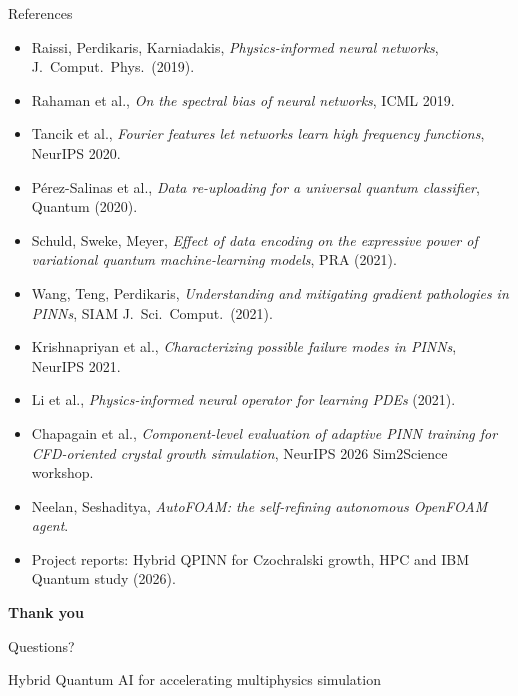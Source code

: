 \documentclass[aspectratio=169]{beamer}
\begin{document}
\begin{frame}{References}
\footnotesize
\begin{itemize}\setlength{\itemsep}{2pt}
  \item Raissi, Perdikaris, Karniadakis, \emph{Physics-informed neural networks}, J.\ Comput.\ Phys.\ (2019).
  \item Rahaman et al., \emph{On the spectral bias of neural networks}, ICML 2019.
  \item Tancik et al., \emph{Fourier features let networks learn high frequency functions}, NeurIPS 2020.
  \item P\'erez-Salinas et al., \emph{Data re-uploading for a universal quantum classifier}, Quantum (2020).
  \item Schuld, Sweke, Meyer, \emph{Effect of data encoding on the expressive power of variational quantum machine-learning models}, PRA (2021).
  \item Wang, Teng, Perdikaris, \emph{Understanding and mitigating gradient pathologies in PINNs}, SIAM J.\ Sci.\ Comput.\ (2021).
  \item Krishnapriyan et al., \emph{Characterizing possible failure modes in PINNs}, NeurIPS 2021.
  \item Li et al., \emph{Physics-informed neural operator for learning PDEs} (2021).
  \item Chapagain et al., \emph{Component-level evaluation of adaptive PINN training for CFD-oriented crystal growth simulation}, NeurIPS 2026 Sim2Science workshop.
  \item Neelan, Seshaditya, \emph{AutoFOAM: the self-refining autonomous OpenFOAM agent}.
  \item Project reports: Hybrid QPINN for Czochralski growth, HPC and IBM Quantum study (2026).
\end{itemize}
\end{frame}

\begin{frame}
\centering
\Large\textbf{Thank you}

\vspace{0.4cm}
\normalsize Questions?

\vspace{0.6cm}
\small Hybrid Quantum AI for accelerating multiphysics simulation
\end{frame}
\end{document}
